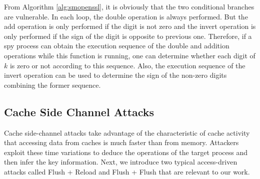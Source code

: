 From Algorithm \ref{alg:smopenssl}, it is obviously that the two conditional branches are vulnerable.
In each loop, the double operation is always performed.
But the add operation is only performed if the digit is not zero and the invert operation is only performed if the sign of the digit is opposite to previous one.
Therefore, if a spy process can obtain the execution sequence of
  the double and addition operations while this function is running,
one can determine whether each digit of $k$ is zero or not according to this sequence.
Also,  the execution sequence of the invert operation can be used to determine the sign of the non-zero digits combining the former sequence.



\subsection{Cache Side Channel Attacks}
\label{intro_cacheattack}
Cache side-channel attacks take advantage of the characteristic of cache activity
 that accessing data from caches is much faster than from memory.
Attackers exploit these time variations to deduce the operations of the target process and then infer the key information.
%
Next, we introduce two typical access-driven attacks called Flush + Reload \cite{flushreload} and Flush + Flush \cite{gruss2016flush} that are relevant to our work.

